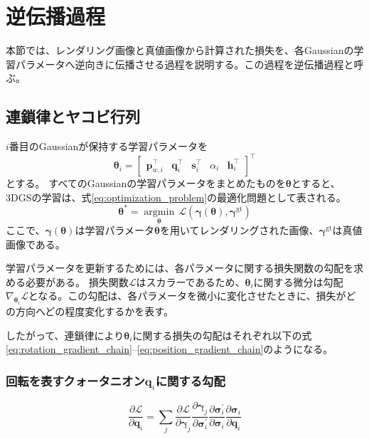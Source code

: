 \documentclass[dvipdfmx]{jlreq}
\begin{document}
\section{逆伝播過程}
\label{sec:backward}
本節では、レンダリング画像と真値画像から計算された損失を、各Gaussianの学習パラメータへ逆向きに伝播させる過程を説明する。この過程を逆伝播過程と呼ぶ。

\subsection{連鎖律とヤコビ行列}
$i$番目のGaussianが保持する学習パラメータを
\begin{equation}
    \bm{\theta}_i = \begin{bmatrix} \bm{p}_{w,i}^{\top} & \bm{q}_i^{\top} & \bm{s}_i^{\top} & \alpha_i & \bm{h}_i^{\top} \end{bmatrix}^{\top}
    \label{eq:gaussian_parameters}
\end{equation}
とする。
すべてのGaussianの学習パラメータをまとめたものを$\bm{\theta}$とすると、3DGSの学習は、式\eqref{eq:optimization_problem}の最適化問題として表される。
\begin{equation}
    \bm{\theta}^{*} = \underset{\bm{\theta}}{\operatorname{argmin}}\, \mathcal{L}\left( \bm{\gamma}(\bm{\theta}), \bm{\gamma}^{\mathrm{gt}} \right)
    \label{eq:optimization_problem}
\end{equation}
ここで、$\bm{\gamma}(\bm{\theta})$は学習パラメータ$\bm{\theta}$を用いてレンダリングされた画像、$\bm{\gamma}^{\mathrm{gt}}$は真値画像である。

学習パラメータを更新するためには、各パラメータに関する損失関数の勾配を求める必要がある。
損失関数$\mathcal{L}$はスカラーであるため、$\bm{\theta}_i$に関する微分は勾配$\nabla_{\bm{\theta}_i}\mathcal{L}$となる。この勾配は、各パラメータを微小に変化させたときに、損失がどの方向へどの程度変化するかを表す。

したがって、連鎖律により$\bm{\theta}_i$に関する損失の勾配はそれぞれ以下の式\eqref{eq:rotation_gradient_chain}--\eqref{eq:position_gradient_chain}のようになる。

\subsubsection*{回転を表すクォータニオン$\bm{q}_i$に関する勾配}
\begin{equation}
    \frac{\partial\mathcal{L}}{\partial\bm{q}_i}
    = \sum_j
    \frac{\partial\mathcal{L}}{\partial\bm{\gamma}_j}
    \frac{\partial\bm{\gamma}_j}{\partial\bm{\sigma}_i^{\prime}}
    \frac{\partial\bm{\sigma}_i^{\prime}}{\partial\bm{\sigma}_i}
    \frac{\partial\bm{\sigma}_i}{\partial\bm{q}_i}
    \label{eq:rotation_gradient_chain}
\end{equation}
\end{document}
